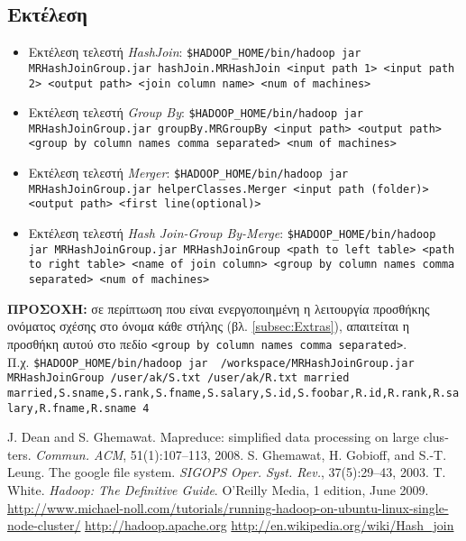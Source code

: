 \documentclass{article}
\newcommand{\en}[1]{\foreignlanguage{english}{#1}}
\begin{document}
\newpage
\begin{appendices}
\renewcommand\appendixtocname{Παράρτημα}

\section{Εκτέλεση} \label{app:Running}
\begin{itemize}
\item Εκτέλεση τελεστή \emph{\en{HashJoin}}: \texttt{\en{\$HADOOP\_HOME/bin/hadoop jar MRHashJoinGroup.jar hashJoin.MRHashJoin <input path 1> <input path 2> <output path> <join column name> <num of machines>}}

\item Εκτέλεση τελεστή \emph{\en{Group By}}: \texttt{\en{\$HADOOP\_HOME/bin/hadoop jar MRHashJoinGroup.jar groupBy.MRGroupBy  <input path> <output path> <group by column names comma separated> <num of machines>}}

\item Εκτέλεση τελεστή \emph{\en{Merger}}: \texttt{\en{\$HADOOP\_HOME/bin/hadoop jar MRHashJoinGroup.jar helperClasses.Merger <input path (folder)> <output path> <first line(optional)>}}

\item Εκτέλεση τελεστή \emph{\en{Hash Join-Group By-Merge}}: \texttt{\en{\$HADOOP\_HOME/bin/hadoop jar MRHashJoinGroup.jar MRHashJoinGroup <path to left table> <path to right table> <name of join column> <group by column names comma separated> <num of machines>}}
\end{itemize}
\textbf{ΠΡΟΣΟΧΉ:} σε περίπτωση που είναι ενεργοποιημένη η λειτουργία προσθήκης ονόματος σχέσης στο όνομα κάθε στήλης (βλ. \ref{subsec:Extras}), απαιτείται η προσθήκη αυτού στο πεδίο \texttt{\en{<group by column names comma separated>}}. \\ Π.χ. \texttt{\en{\$HADOOP\_HOME/bin/hadoop jar ~/workspace/MRHashJoinGroup.jar MRHashJoinGroup /user/ak/S.txt /user/ak/R.txt married \\ married,S.sname,S.rank,S.fname,S.salary,S.id,S.foobar,R.id,R.rank,R.salary,R.fname,R.sname 4}}\\
\end{appendices}

	\begin{thebibliography}{9}
		 \en{J. Dean and S. Ghemawat. Mapreduce: simplified data processing on large clusters. \textit{Commun. ACM}, 51(1):107–113, 2008.
}
 \en{
S. Ghemawat, H. Gobioff, and S.-T. Leung. The google file system. \textit{SIGOPS
Oper. Syst. Rev.}, 37(5):29–43, 2003.
}
 \en{
T. White. \textit{Hadoop: The Definitive Guide}. O’Reilly Media, 1 edition, June 2009.
}
 \en{\url{http://www.michael-noll.com/tutorials/running-hadoop-on-ubuntu-linux-single-node-cluster/}}
 \en{\url{http://hadoop.apache.org}}
 \en{\url{http://en.wikipedia.org/wiki/Hash_join}}


	\end{thebibliography}
\end{document}
